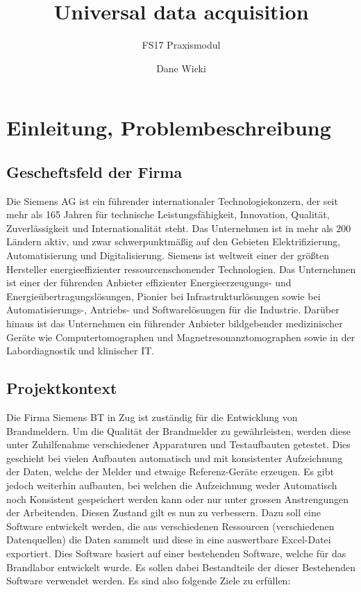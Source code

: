 \documentclass[10pt]{scrartcl}
\author{Dane Wicki}
\title{Universal data acquisition}
\subtitle{FS17 Praxismodul}
\begin{document}
\maketitle
\tableofcontents
\section{Einleitung, Problembeschreibung}
\subsection{Gescheftsfeld der Firma}
Die Siemens AG ist ein führender internationaler Technologiekonzern, der seit mehr als 165 Jahren für technische Leistungsfähigkeit, Innovation, Qualität, Zuverlässigkeit und Internationalität steht. Das Unternehmen ist in mehr als 200 Ländern aktiv, und zwar schwerpunktmäßig auf den Gebieten Elektrifizierung, Automatisierung und Digitalisierung. Siemens ist weltweit einer der größten Hersteller energieeffizienter ressourcenschonender Technologien. Das Unternehmen ist einer der führenden Anbieter effizienter Energieerzeugungs- und Energieübertragungslösungen, Pionier bei Infrastrukturlösungen sowie bei Automatisierungs-, Antriebs- und Softwarelösungen für die Industrie. Darüber hinaus ist das Unternehmen ein führender Anbieter bildgebender medizinischer Geräte wie Computertomographen und Magnetresonanztomographen sowie in der Labordiagnostik und klinischer IT.
\subsection{Projektkontext}
Die Firma Siemens BT in Zug ist zuständig für die Entwicklung von Brandmeldern.
Um die Qualität der Brandmelder zu gewährleisten, werden diese unter Zuhilfenahme
verschiedener Apparaturen und Testaufbauten getestet. Dies geschieht bei vielen Aufbauten automatisch und mit konsistenter Aufzeichnung der Daten, welche der Melder und etwaige Referenz-Geräte erzeugen. Es gibt jedoch weiterhin aufbauten, bei welchen die Aufzeichnung weder Automatisch noch Konsistent gespeichert werden kann oder nur unter grossen Anstrengungen der Arbeitenden. Diesen Zustand gilt es nun zu verbessern.
Dazu soll eine Software entwickelt werden, die aus verschiedenen Ressourcen (verschiedenen
Datenquellen) die Daten sammelt und diese in eine auswertbare Excel-Datei exportiert. Dies
Software basiert auf einer bestehenden Software, welche für das Brandlabor entwickelt wurde.
Es sollen dabei Bestandteile der dieser Bestehenden Software verwendet werden.
Es sind also folgende Ziele zu erfüllen:
\end{document}
